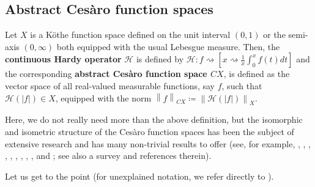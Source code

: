 \documentclass[11pt]{amsart}
\theoremstyle{definition}
\theoremstyle{definition}
\theoremstyle{definition}
\theoremstyle{definition}
\theoremstyle{definition}
\theoremstyle{definition}
\theoremstyle{definition}
\theoremstyle{definition}
\numberwithin{equation}{section}
\numberwithin{equation}{section}
\numberwithin{equation}{section}
\theoremstyle{definition}
\theoremstyle{definition}
\theoremstyle{definition}
\theoremstyle{definition}
\theoremstyle{definition}
\theoremstyle{definition}
\newcommand{\norm}[1]{\left\lVert#1\right\rVert}
\newcommand{\abs}[1]{\left\lvert#1\right\rvert}
\begin{document}
\subsection{Abstract Ces{\` a}ro function spaces}

Let $X$ is a K{\" o}the function space defined on the unit interval $(0,1)$ or the semi-axis $(0,\infty)$
both equipped with the usual Lebesgue measure.
Then, the {\bf continuous Hardy operator} $\mathscr{H}$ is defined by
$\mathscr{H} \colon f \rightsquigarrow \left[ x \rightsquigarrow \frac{1}{x}\int_0^x f(t)dt \right]$
and the corresponding {\bf abstract Ces{\` a}ro function space $CX$}, is defined as the vector space of all real-valued measurable
functions, say $f$, such that $\mathscr{H}(\abs{f}) \in X$, equipped with the norm $\norm{f}_{CX} \coloneqq \norm{\mathscr{H}(\abs{f})}_X$.

Here, we do not really need more than the above definition, but the isomorphic and isometric structure of the Ces{\` a}ro function spaces
has been the subject of extensive research and has many non-trivial results to offer (see, for example, \cite{ALM19}, \cite{CR16}, \cite{DS07},
\cite{KKM21}, \cite{KKT22}, \cite{KMS07}, \cite{KT17}, \cite{KT24}, \cite{LM15a}, \cite{LM16} and \cite{MS06}; see also a survey \cite{AM14} and references therein).

Let us get to the point (for unexplained notation, we refer directly to \cite{KT24}).
\end{document}
